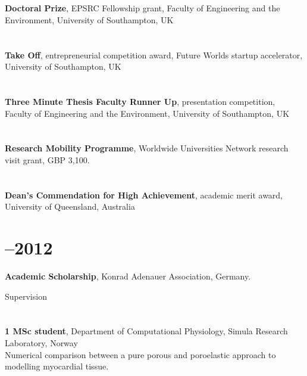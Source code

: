 \documentclass[margin,line,10pt]{res}
\begin{document}
\begin{resume}
\section{}{\bf Doctoral Prize}, EPSRC Fellowship grant, Faculty of Engineering and the Environment, University of Southampton, UK\\
\vspace*{-.35in}
\section{}{\bf Take Off}, entrepreneurial competition award, Future Worlds startup accelerator, University of Southampton, UK\\
\vspace*{-.35in}
\section{}{\bf Three Minute Thesis Faculty Runner Up}, presentation competition, Faculty of Engineering and the Environment, University of Southampton, UK\\
\vspace*{-.35in}
\section{}{\bf Research Mobility Programme}, Worldwide Universities Network research visit grant, GBP 3,100.\\
\vspace*{-.35in}
\section{}{\bf Dean's Commendation for High Achievement}, academic merit award, University of Queensland, Australia\\
\vspace*{-.35in}
\section{--2012}{\bf Academic Scholarship}, Konrad Adenauer Association, Germany.\\

\vspace*{-.2in}

{\sc Supervision}\\
\vspace*{-.35in}
\section{}{\bf 1 MSc student}, Department of Computational Physiology, Simula Research Laboratory, Norway\\
Numerical comparison between a pure porous and poroelastic approach to modelling myocardial tissue.\\
\vspace*{-.35in}

\end{resume}
\end{document}
